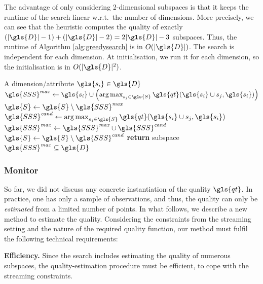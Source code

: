 The advantage of only considering 2-dimensional subspaces is that it keeps the runtime of the search linear w.r.t.\ the number of dimensions. More precisely, we can see that the heuristic computes the quality of exactly $(|\gls{D}|-1) + (|\gls{D}|-2) = 2|\gls{D}| -3$ subspaces. Thus, the runtime of Algorithm \ref{alg:greedysearch} is in $O(|\gls{D}|)$. The search is independent for each dimension. At initialisation, we run it for each dimension, so the initialisation is in $O(|\gls{D}|^2)$.

\begin{algorithm}
	\footnotesize
	\caption{$\textsc{Search}_t$($\gls{s_i}$)}\label{alg:greedysearch} 
	\begin{algorithmic}[1]
		\Require A dimension/attribute $\gls{s_i} \in \gls{D}$ 		
		\State $\gls{SSS}^{\mathit{max}} \gets \gls{s_i} \cup \left (\argmax_{s_j \in \gls{S}} \gls{qt}(\gls{s_i} \cup s_j, \gls{s_i}) \right ) $ \label{alg:greedysearch:line1}
		\State $\gls{S} \gets \gls{S} \setminus \gls{SSS}^{\mathit{max}}$
		\State $\gls{SSS}^{\mathit{cand}} \gets \argmax_{s_j \in \gls{S}} \gls{qt}(\gls{s_i} \cup s_j, \gls{s_i}) $ \label{alg:greedysearch:line4}
		 \label{alg:greedysearch:line5}
		\State $\gls{SSS}^{\mathit{max}} \gets \gls{SSS}^{\mathit{max}} \cup \gls{SSS}^{\mathit{cand}}$ \label{alg:greedysearch:line6}
		\EndIf
		\State $\gls{S} \gets \gls{S} \setminus \gls{SSS}^{\mathit{cand}}$
		\EndWhile
		\State \textbf{return} subspace $\gls{SSS}^{\mathit{max}} \subseteq \gls{D}$
	\end{algorithmic}
\end{algorithm}

\subsubsection{Monitor}

So far, we did not discuss any concrete instantiation of the quality $\gls{qt}$. In practice, one has only a sample of observations, and thus, the quality can only be \textit{estimated} from a limited number of points. In what follows, we describe a new method to estimate the quality. Considering the constraints from the streaming setting and the nature of the required quality function, our method must fulfil the following technical requirements:

\textbf{Efficiency.} Since the search includes estimating the quality of numerous subspaces, the quality-estimation procedure must be efficient, to cope with the streaming constraints.  

